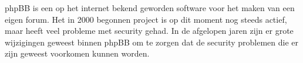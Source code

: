 \samenvatting

phpBB is een op het internet bekend geworden software voor het maken van een eigen forum. Het in 2000\cite{bib.phpbb.history} begonnen project is op dit moment nog steeds actief, maar heeft veel probleme met security gehad. In de afgelopen jaren zijn er grote wijzigingen geweest binnen phpBB om te zorgen dat de security problemen die er zijn geweest voorkomen kunnen worden. 
